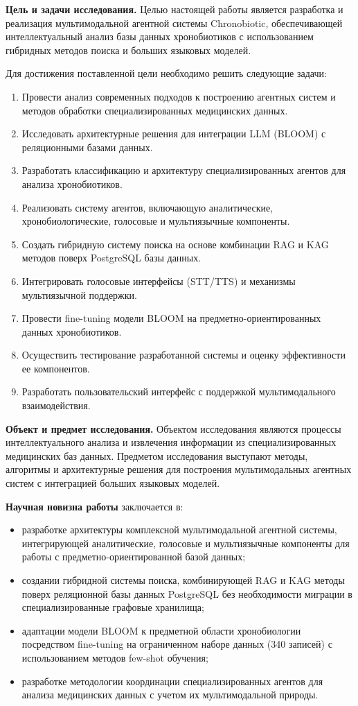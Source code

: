 \documentclass[a4paper,14pt]{extarticle}
\begin{document}
	\textbf{Цель и задачи исследования.} Целью настоящей работы является разработка и реализация мультимодальной агентной системы Chronobiotic, обеспечивающей интеллектуальный анализ базы данных хронобиотиков с использованием гибридных методов поиска и больших языковых моделей.
	
	Для достижения поставленной цели необходимо решить следующие задачи:
	\begin{enumerate}
		\item Провести анализ современных подходов к построению агентных систем и методов обработки специализированных медицинских данных.
		\item Исследовать архитектурные решения для интеграции LLM (BLOOM) с реляционными базами данных.
		\item Разработать классификацию и архитектуру специализированных агентов для анализа хронобиотиков.
		\item Реализовать систему агентов, включающую аналитические, хронобиологические, голосовые и мультиязычные компоненты.
		\item Создать гибридную систему поиска на основе комбинации RAG и KAG методов поверх PostgreSQL базы данных.
		\item Интегрировать голосовые интерфейсы (STT/TTS) и механизмы мультиязычной поддержки.
		\item Провести fine-tuning модели BLOOM на предметно-ориентированных данных хронобиотиков.
		\item Осуществить тестирование разработанной системы и оценку эффективности ее компонентов.
		\item Разработать пользовательский интерфейс с поддержкой мультимодального взаимодействия.
	\end{enumerate}
	
	\textbf{Объект и предмет исследования.} Объектом исследования являются процессы интеллектуального анализа и извлечения информации из специализированных медицинских баз данных. Предметом исследования выступают методы, алгоритмы и архитектурные решения для построения мультимодальных агентных систем с интеграцией больших языковых моделей.
	
	\textbf{Научная новизна работы} заключается в:
	\begin{itemize}
		\item разработке архитектуры комплексной мультимодальной агентной системы, интегрирующей аналитические, голосовые и мультиязычные компоненты для работы с предметно-ориентированной базой данных;
		\item создании гибридной системы поиска, комбинирующей RAG и KAG методы поверх реляционной базы данных PostgreSQL без необходимости миграции в специализированные графовые хранилища;
		\item адаптации модели BLOOM к предметной области хронобиологии посредством fine-tuning на ограниченном наборе данных (340 записей) с использованием методов few-shot обучения;
		\item разработке методологии координации специализированных агентов для анализа медицинских данных с учетом их мультимодальной природы.
	\end{itemize}
	
\end{document}
